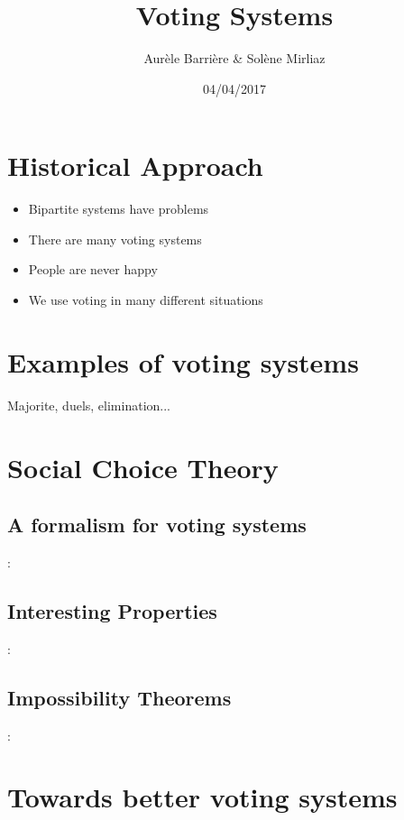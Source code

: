 \documentclass{beamer}
\title{Voting Systems}
\author{Aur\`ele Barri\`ere \& Sol\`ene Mirliaz}
\date{04/04/2017}
\begin{document}
\begin{frame}
\maketitle
\end{frame}

\section{Historical Approach}
\begin{frame}{\secname}
  \begin{itemize}
  \item Bipartite systems have problems
  \item There are many voting systems
  \item People are never happy
  \item We use voting in many different situations
  \end{itemize}
  
\end{frame}

\section{Examples of voting systems}
\begin{frame}{\secname}
  Majorite, duels, elimination...
\end{frame}



\section{Social Choice Theory}
\subsection{A formalism for voting systems}
\begin{frame}{\secname: \subsecname}

\end{frame}

\subsection{Interesting Properties}
\begin{frame}{\secname: \subsecname}

\end{frame}


\subsection{Impossibility Theorems}
\begin{frame}{\secname: \subsecname}

\end{frame}


\section{Towards better voting systems}
\begin{frame}{\secname}

\end{frame}
\end{document}
